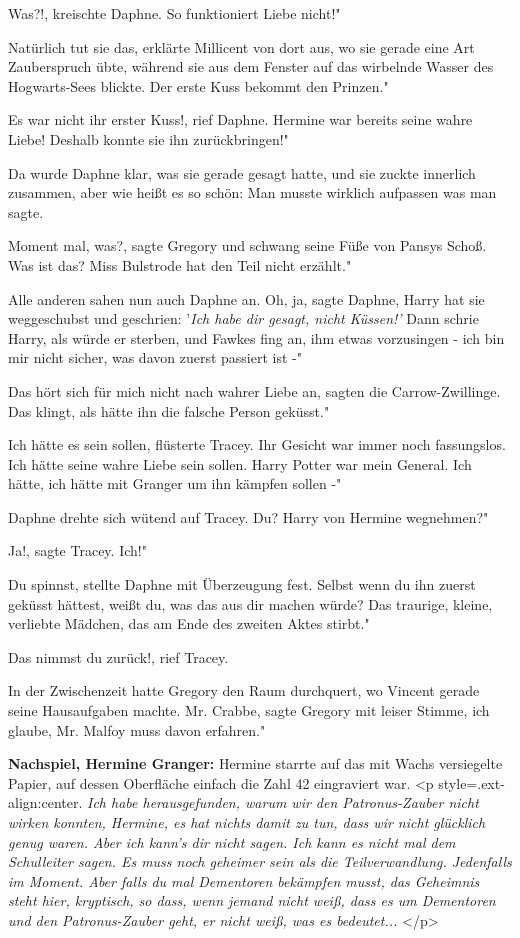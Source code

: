 \glqq Was?!\grqq{}, kreischte Daphne. \glqq So funktioniert Liebe nicht!"

\glqq Natürlich tut sie das\grqq{}, erklärte Millicent von dort aus, wo sie
gerade eine Art Zauberspruch übte, während sie aus dem Fenster auf das wirbelnde
Wasser des Hogwarts-Sees blickte. \glqq Der erste Kuss bekommt den Prinzen."

\glqq Es war nicht ihr erster Kuss!\grqq{}, rief Daphne. \glqq Hermine war
bereits seine wahre Liebe! Deshalb konnte sie ihn zurückbringen!"

Da wurde Daphne klar, was sie gerade gesagt hatte, und sie zuckte innerlich
zusammen, aber wie heißt es so schön: Man musste wirklich aufpassen was man
sagte.

\glqq Moment mal, was?\grqq{}, sagte Gregory und schwang seine Füße von Pansys
Schoß. \glqq Was ist das? Miss Bulstrode hat den Teil nicht erzählt."

Alle anderen sahen nun auch Daphne an. \glqq Oh, ja\grqq{}, sagte Daphne, \glqq
Harry hat sie weggeschubst und geschrien: '\emph{Ich habe dir gesagt, nicht
Küssen!' }Dann schrie Harry, als würde er sterben, und Fawkes fing an, ihm etwas
vorzusingen - ich bin mir nicht sicher, was davon zuerst passiert ist -"

\glqq Das hört sich für mich nicht nach wahrer Liebe an\grqq{}, sagten die
Carrow-Zwillinge. \glqq Das klingt, als hätte ihn die falsche Person geküsst."

\glqq Ich hätte es sein sollen\grqq{}, flüsterte Tracey. Ihr Gesicht war immer
noch fassungslos. \glqq Ich hätte seine wahre Liebe sein sollen. Harry Potter
war mein General. Ich hätte, ich hätte mit Granger um ihn kämpfen sollen -"

Daphne drehte sich wütend auf Tracey. \glqq Du? Harry von Hermine wegnehmen?"

\glqq Ja!\grqq{}, sagte Tracey. \glqq Ich!"

\glqq Du spinnst\grqq{}, stellte Daphne mit Überzeugung fest. \glqq Selbst wenn
du ihn zuerst geküsst hättest, weißt du, was das aus dir machen würde? Das
traurige, kleine, verliebte Mädchen, das am Ende des zweiten Aktes stirbt."

\glqq Das nimmst du zurück!\grqq{}, rief Tracey.

In der Zwischenzeit hatte Gregory den Raum durchquert, wo Vincent gerade seine
Hausaufgaben machte. \glqq Mr. Crabbe\grqq{}, sagte Gregory mit leiser Stimme,
\glqq ich glaube, Mr. Malfoy muss davon erfahren."


\textbf{Nachspiel, Hermine Granger:}
Hermine starrte auf das mit Wachs versiegelte Papier, auf dessen Oberfläche
einfach die Zahl 42 eingraviert war. <p style=\grqq{}.ext-align:center\grqq{}.
\emph{Ich habe herausgefunden, warum wir den Patronus-Zauber nicht wirken
konnten, Hermine, es hat nichts damit zu tun, dass wir nicht glücklich genug
waren. Aber ich kann's dir nicht sagen. Ich kann es nicht mal dem Schulleiter
sagen. Es muss noch geheimer sein als die Teilverwandlung. Jedenfalls im Moment.
Aber falls du mal Dementoren bekämpfen musst, das Geheimnis steht hier,
kryptisch, so dass, wenn jemand nicht weiß, dass es um Dementoren und den
Patronus-Zauber geht, er nicht weiß, was es bedeutet... }</p>

